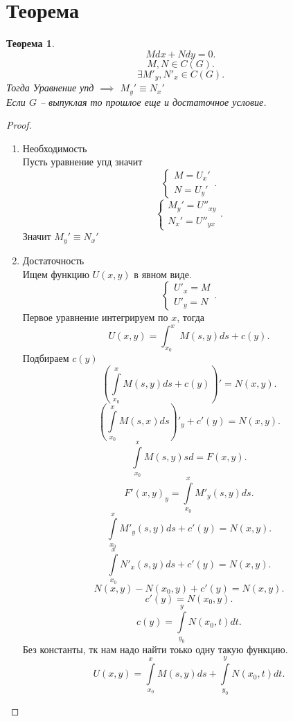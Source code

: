 \documentclass[14pt]{extarticle}
\newtheorem{theorem}{Теорема}
\begin{document}
\section{Теорема}
\begin{theorem}
	\[
		M dx + N dy = 0
		.\]
	\[
		M, N \in C(G)
		.\]
	\[
		\exists  M'_{y} ,N'_{x} \in C(G)
		.\]
	Тогда Уравнение упд $\implies$  $M_{y}' \equiv N_{x}'$ \\
	Если $G$ -- выпуклая то прошлое еще и достаточное условие.
\end{theorem}
\begin{proof}
	\begin{enumerate}
		\item Необходимость\\
		      Пусть уравнение упд значит
		      \[
			      \begin{cases}
				      M = U_{x}' \\
				      N = U_{y}'
			      \end{cases}
			      .\]
		      \[
			      \begin{cases}
				      M_{y}' = U''_{xy} \\
				      N_{x}' = U''_{yx}
			      \end{cases}
			      .\]
		      Значит $M_{y}' \equiv N_{x}'$
		\item Достаточность\\
		      Ищем функцию $U(x,y)$ в явном виде.
		      \[
			      \begin{cases}
				      U'_{x} = M \\
				      U'_{y} = N
			      \end{cases}
			      .\]
		      Первое уравнение интегрируем по $x$, тогда
		      \[
			      U(x,y) = \int_{x_0}^{x} M(s,y) ds + c(y)
			      .\]
		      Подбираем $c(y)$
		      \[
			      (  \int\limits_{x_0}^{x} M(s,y) ds + c(y) )' = N(x,y)
			      .\]
		      \[
			      (\int\limits_{x_0}^{x} M(s,x) ds )'_{y} + c'(y) = N(x,y)
			      .\]
		      \[
			      \int\limits_{x_0}^{x}  M(s,y)  sd = F(x,y)
			      .\]
		      \[
			      F'(x,y)_{y} = \int\limits_{x_0}^{x} M'_{y} (s,y)ds
			      .\]
		      \[
			      \int\limits_{x_0}^{x} M'_{y} (s,y) ds + c'(y) = N(x,y)
			      .\]
		      \[
			      \int\limits_{x_0}^{x}  N'_{x}(s,y)ds + c'(y) = N(x,y)
			      .\]
		      \[
			      N(x,y) - N(x_0,y) + c'(y) = N(x,y)
			      .\]
		      \[
			      c'(y) = N(x_0,y)
			      .\]
		      \[
			      c(y) = \int\limits_{y_0}^{y} N(x_0,t) dt
			      .\]
		      Без константы, тк нам надо найти тоько одну такую функцию.
		      \[
			      U(x,y) = \int\limits_{x_0}^{x}  M(s,y)  ds + \int\limits_{y_0}^{y} N(x_0,t) dt
			      .\]
	\end{enumerate}
\end{proof}
\end{document}
